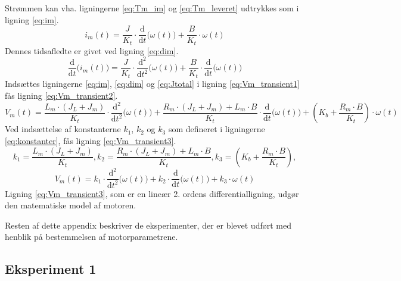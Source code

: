 Strømmen kan vha. ligningerne \ref{eq:Tm_im} og \ref{eq:Tm_leveret} udtrykkes som i ligning \ref{eq:im}.
\begin{equation}
	i_m\left(t\right)=\frac{J}{K_t}\cdot{}\frac{\mathrm d}{\mathrm d t} \big(\omega\left(t\right) \big)+\frac{B}{K_t}\cdot{}\omega\left(t\right)
	\label{eq:im} 
 \end{equation}
Dennes tidsafledte er givet ved ligning \ref{eq:dim}.
\begin{equation}
	\frac{\mathrm d}{\mathrm d t} \big(i_m\left(t\right) \big)=\frac{J}{K_t}\cdot{}\frac{\mathrm d^2}{\mathrm d t^2} \big(\omega\left(t\right) \big)
		+\frac{B}{K_t}\cdot{}\frac{\mathrm d}{\mathrm d t} \big(\omega\left(t\right) \big)
	\label{eq:dim} 
 \end{equation}
Indsættes ligningerne \ref{eq:im}, \ref{eq:dim} og \ref{eq:Jtotal} i ligning \ref{eq:Vm_transient1} fås ligning \ref{eq:Vm_transient2}.
\begin{equation}
	V_m\left(t\right)=\frac{L_m\cdot{}\left(J_L+J_m\right)}{K_t}\cdot{}\frac{\mathrm d^2}{\mathrm d t^2} \big(\omega\left(t\right) \big)
		+\frac{R_m\cdot{}\left(J_L+J_m\right)+L_m\cdot{}B}{K_t}\cdot{}\frac{\mathrm d}{\mathrm d t} \big(\omega\left(t\right) \big)
		+\left(K_b+\frac{R_m\cdot{}B}{K_t}\right)\cdot{}\omega\left(t\right)
	\label{eq:Vm_transient2} 
 \end{equation}
Ved indsættelse af konstanterne \(k_1\), \(k_2\) og \(k_3\) som defineret i ligningerne \ref{eq:konstanter},
fås ligning \ref{eq:Vm_transient3}.
\begin{equation}
	k_1=\frac{L_m\cdot{}\left(J_L+J_m\right)}{K_t},
	k_2=\frac{R_m\cdot{}\left(J_L+J_m\right)+L_m\cdot{}B}{K_t},
	k_3=\left(K_b+\frac{R_m\cdot{}B}{K_t}\right),
	\label{eq:konstanter} 
 \end{equation}
\begin{equation}
	V_m\left(t\right)=k_1\cdot{}\frac{\mathrm d^2}{\mathrm d t^2} \big(\omega\left(t\right) \big)
		+k_2\cdot{}\frac{\mathrm d}{\mathrm d t} \big(\omega\left(t\right) \big)
		+k_3\cdot{}\omega\left(t\right)
	\label{eq:Vm_transient3}
 \end{equation}
Ligning \ref{eq:Vm_transient3}, som er en lineær 2. ordens differentialligning, udgør den matematiske model af motoren.

Resten af dette appendix beskriver de eksperimenter, der er blevet udført med henblik på bestemmelsen af motorparametrene.
\subsection{Eksperiment 1}
\label{ss:eksperiment1}
